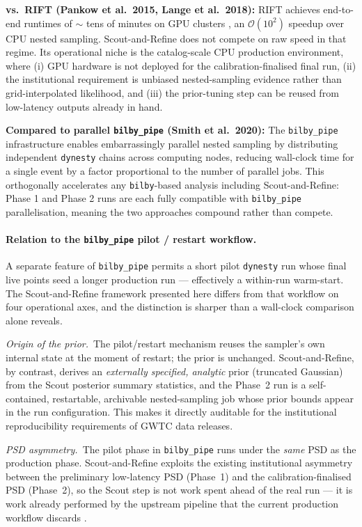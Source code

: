 \documentclass[12pt]{article}
\begin{document}
\textbf{vs.\ RIFT (Pankow et al.\ 2015, Lange et al.\ 2018):} RIFT achieves end-to-end runtimes of $\sim$ tens of minutes on GPU clusters \cite{Pankow2015,Lange2018}, an $\mathcal{O}(10^2)$ speedup over CPU nested sampling. Scout-and-Refine does not compete on raw speed in that regime. Its operational niche is the catalog-scale CPU production environment, where (i) GPU hardware is not deployed for the calibration-finalised final run, (ii) the institutional requirement is unbiased nested-sampling evidence rather than grid-interpolated likelihood, and (iii) the prior-tuning step can be reused from low-latency outputs already in hand.

\textbf{Compared to parallel \texttt{bilby\_pipe} (Smith et al.\ 2020):} The \texttt{bilby\_pipe} infrastructure \cite{Smith2020} enables embarrassingly parallel nested sampling by distributing independent \texttt{dynesty} chains across computing nodes, reducing wall-clock time for a single event by a factor proportional to the number of parallel jobs. This orthogonally accelerates any \texttt{bilby}-based analysis including Scout-and-Refine: Phase 1 and Phase 2 runs are each fully compatible with \texttt{bilby\_pipe} parallelisation, meaning the two approaches compound rather than compete.

\paragraph{Relation to the \texttt{bilby\_pipe} pilot / restart workflow.}
A separate feature of \texttt{bilby\_pipe} \cite{Smith2020} permits a short pilot \texttt{dynesty} run whose final live points seed a longer production run --- effectively a within-run warm-start. The Scout-and-Refine framework presented here differs from that workflow on four operational axes, and the distinction is sharper than a wall-clock comparison alone reveals.

\textit{Origin of the prior.}\ The pilot/restart mechanism reuses the sampler's own internal state at the moment of restart; the prior is unchanged. Scout-and-Refine, by contrast, derives an \emph{externally specified, analytic} prior (truncated Gaussian) from the Scout posterior summary statistics, and the Phase~2 run is a self-contained, restartable, archivable nested-sampling job whose prior bounds appear in the run configuration. This makes it directly auditable for the institutional reproducibility requirements of GWTC data releases.

\textit{PSD asymmetry.}\ The pilot phase in \texttt{bilby\_pipe} runs under the \emph{same} PSD as the production phase. Scout-and-Refine exploits the existing institutional asymmetry between the preliminary low-latency PSD (Phase~1) and the calibration-finalised PSD (Phase~2), so the Scout step is not work spent ahead of the real run --- it is work already performed by the upstream pipeline that the current production workflow discards \cite{Chaudhary2024,Sun2020,Biscoveanu2020}.
\end{document}
